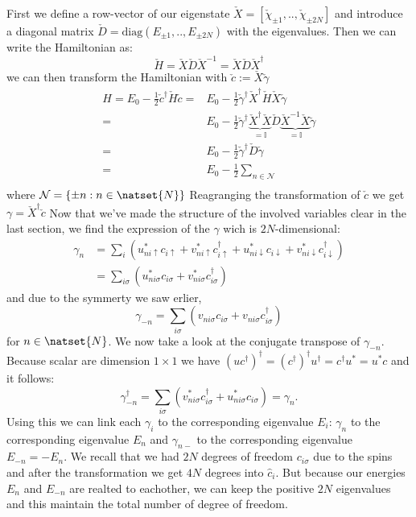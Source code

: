 \documentclass[../main.tex]{subfile}
\begin{document}
First we define a row-vector of our eigenstate $\check{X} = [\check{\chi}_{\pm 1},..,\check{\chi}_{\pm 2N}]$ and introduce 
a diagonal matrix $\check{D} = \text{diag}(E_{\pm 1},..,E_{\pm 2N})$ with the eigenvalues.
Then we can write the Hamiltonian as:
\[
    \check{H} = \check{X}\check{D}\check{X}^{-1} = \check{X}\check{D}\check{X}^{\dagger} 
\]
we can then transform the Hamiltonian with $\check{c} := \check{X}\check{\gamma}$
\begin{align*}
    H = E_0 - \frac{1}{2}\check{c}^{\dagger}\check{H}\check{c} =& E_0 - \frac{1}{2}\check{\gamma}^{\dagger}\check{X}^{\dagger}\check{H}\check{X}\check{\gamma}\\
    =& E_0 - \frac{1}{2}\check{\gamma}^{\dagger}\underbrace{\check{X}^{\dagger} \check{X}}_{=\mathbb{I}}\check{D}\underbrace{\check{X}^{-1}\check{X}}_{=\mathbb{I}}\check{\gamma}\\
    =& E_0 - \frac{1}{2}\check{\gamma}^{\dagger}\check{D}\check{\gamma}\\
    =& E_0 - \frac{1}{2}\sum_{n\in\mathcal{N}}\\
\end{align*}
where $\mathcal{N}= \{\pm n : n \in \natset{N}\}$
Reagranging the transformation of $\check{c}$ we get $\gamma = \check{X}^{\dagger}\check{c}$   
Now that we've made the structure of the involved variables clear in the last section, we find the expression of the $\gamma$ wich is $2N$-dimensional:
\begin{align*}
    \gamma_n &= \sum_{i} \left( u_{ni\uparrow}^{\ast}c_{i\uparrow}+ v_{ni\uparrow}^{\ast}c_{i\uparrow}^{\dagger} +  u_{ni\downarrow}^{\ast}c_{i\downarrow}+ v_{ni\downarrow}^{\ast}c_{i\downarrow}^{\dagger}\right)\\
        &=  \sum_{i\sigma} \left( u_{ni\sigma}^{\ast}c_{i\sigma}+ v_{ni\sigma}^{\ast}c_{i\sigma}^{\dagger}\right)
\end{align*}
and due to the symmerty we saw erlier, 
\[
    \gamma_{-n} =  \sum_{i\sigma} \left( v_{ni\sigma}c_{i\sigma}+ v_{ni\sigma}c_{i\sigma}^{\dagger}\right)
\]
for $n\in \natset{N}$. We now take a look at the conjugate transpose of $\gamma_{-n}$. Because scalar are dimension $1\times1$ we have 
$(uc^{\dagger})^{\dagger} = (c^{\dagger})^{\dagger} u^{\dagger} =  c^{\dagger} u^{\ast} = u^{\ast}c$ and it follows:
\[
    \gamma_{-n}^{\dagger} = \sum_{i\sigma} \left( v_{ni\sigma}^{\ast}c_{i\sigma}^{\dagger}+ u_{ni\sigma}^{\ast}c_{i\sigma}\right) = \gamma_n.
\]
Using this we can link each $\gamma_i$ to the corresponding eigenvalue $E_i$:  $\gamma_n$ to the corresponding eigenvalue $E_n$ and $\gamma_{n-}$ to the corresponding eigenvalue $E_{-n} = -E_n$.
We recall that we had $2N$ degrees of freedom $c_{i\sigma}$ due
to the spins and after the transformation we get $4N$ degrees into $\hat{c}_i$. But because our energies $E_n$ and $E_{-n}$ are realted to eachother, we can keep the positive $2N$ eigenvalues
and this maintain the total number of degree of freedom.\\
\end{document}
